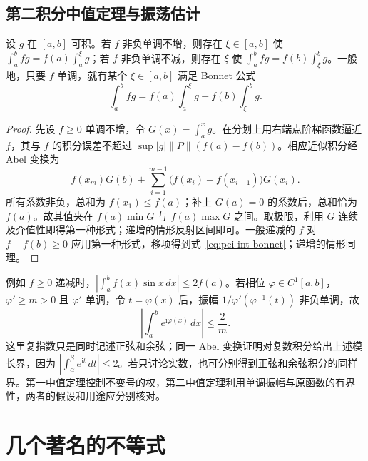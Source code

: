 \subsection{第二积分中值定理与振荡估计}
\begin{theorem}
\label{thm:pei-int-second-mean}
设 $g$ 在 $[a,b]$ 可积。若 $f$ 非负单调不增，则存在 $\xi\in[a,b]$ 使 $\int_a^bfg=f(a)\int_a^\xi g$；若 $f$ 非负单调不减，则存在 $\xi$ 使 $\int_a^bfg=f(b)\int_\xi^bg$。一般地，只要 $f$ 单调，就有某个 $\xi\in[a,b]$ 满足 Bonnet 公式
\begin{equation}
 \int_a^bfg=f(a)\int_a^\xi g+f(b)\int_\xi^bg.
 \label{eq:pei-int-bonnet}
\end{equation}
\end{theorem}
\begin{proof}
先设 $f\ge0$ 单调不增，令 $G(x)=\int_a^xg$。在分划上用右端点阶梯函数逼近 $f$，其与 $f$ 的积分误差不超过 $\sup|g|\lVert P\rVert(f(a)-f(b))$。相应近似积分经 Abel 变换为
\[
 f(x_m)G(b)+\sum_{i=1}^{m-1}\bigl(f(x_i)-f(x_{i+1})\bigr)G(x_i).
\]
所有系数非负，总和为 $f(x_1)\le f(a)$；补上 $G(a)=0$ 的系数后，总和恰为 $f(a)$。故其值夹在 $f(a)\min G$ 与 $f(a)\max G$ 之间。取极限，利用 $G$ 连续及介值性即得第一种形式；递增的情形反射区间即可。一般递减的 $f$ 对 $f-f(b)\ge0$ 应用第一种形式，移项得到式~\eqref{eq:pei-int-bonnet}；递增的情形同理。
\end{proof}
例如 $f\ge0$ 递减时，$|\int_a^bf(x)\sin x\,dx|\le2f(a)$。若相位 $\varphi\in C^1[a,b]$，$\varphi'\ge m>0$ 且 $\varphi'$ 单调，令 $t=\varphi(x)$ 后，振幅 $1/\varphi'(\varphi^{-1}(t))$ 非负单调，故
\[
 \left|\int_a^be^{\mathrm i\varphi(x)}\,dx\right|\le\frac2m.
\]
这里复指数只是同时记述正弦和余弦；同一 Abel 变换证明对复数积分给出上述模长界，因为 $|\int_\alpha^\beta e^{\mathrm it}\,dt|\le2$。若只讨论实数，也可分别得到正弦和余弦积分的同样界。第一中值定理控制不变号的权，第二中值定理利用单调振幅与原函数的有界性，两者的假设和用途应分别核对。

\section{几个著名的不等式}
\label{sec:pei-int-classical-inequalities}

